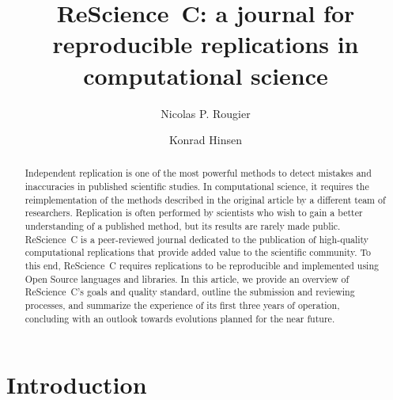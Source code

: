 \documentclass[runningheads]{llncs}
\begin{document}
%
\title{ReScience~C: a journal for reproducible replications in computational science}
%

\author{Nicolas P. Rougier \and
Konrad Hinsen}
%
%
%
\maketitle              %
%
\begin{abstract}
  Independent replication is one of the most powerful methods to
  detect mistakes and inaccuracies in published scientific studies.
  In computational science, it requires the reimplementation of the
  methods described in the original article by a different team of
  researchers.  Replication is often performed by scientists who wish
  to gain a better understanding of a published method, but its
  results are rarely made public. ReScience~C is a peer-reviewed
  journal dedicated to the publication of high-quality computational
  replications that provide added value to the scientific community.
  To this end, ReScience~C requires replications to be reproducible
  and implemented using Open Source languages and libraries. In this
  article, we provide an overview of ReScience~C's goals and quality
  standard, outline the submission and reviewing processes, and
  summarize the experience of its first three years of operation,
  concluding with an outlook towards evolutions planned for the near
  future.

\end{abstract}
%
\section{Introduction}

%
%


%
\end{document}

